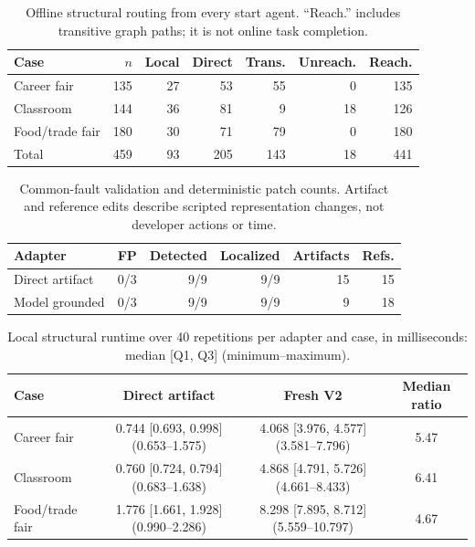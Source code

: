 \begin{table}[!htbp]
  \caption{Offline structural routing from every start agent. ``Reach.''
  includes transitive graph paths; it is not online task completion.}
  \label{tab:rq1-routing}
  \centering
  \begin{tabular}{@{}lrrrrrr@{}}
    \toprule
    Case & $n$ & Local & Direct & Trans. & Unreach. & Reach. \\
    \midrule
    Career fair & 135 & 27 & 53 & 55 & 0 & 135 \\
    Classroom & 144 & 36 & 81 & 9 & 18 & 126 \\
    Food/trade fair & 180 & 30 & 71 & 79 & 0 & 180 \\
    \midrule
    Total & 459 & 93 & 205 & 143 & 18 & 441 \\
    \bottomrule
  \end{tabular}
\end{table}

\begin{table}[!htbp]
  \caption{Common-fault validation and deterministic patch counts. Artifact
  and reference edits describe scripted representation changes, not developer
  actions or time.}
  \label{tab:rq2-faults}
  \centering
  \begin{tabular}{@{}lrrrrr@{}}
    \toprule
    Adapter & FP & Detected & Localized & Artifacts & Refs. \\
    \midrule
    Direct artifact & 0/3 & 9/9 & 9/9 & 15 & 15 \\
    Model grounded & 0/3 & 9/9 & 9/9 & 9 & 18 \\
    \bottomrule
  \end{tabular}
\end{table}

\begin{table}[!htbp]
  \caption{Local structural runtime over 40 repetitions per adapter and case,
  in milliseconds: median [Q1, Q3] (minimum--maximum).}
  \label{tab:rq2-runtime}
  \centering
  \begin{tabular}{@{}lccc@{}}
    \toprule
    Case & Direct artifact & Fresh V2 & Median ratio \\
    \midrule
    Career fair
      & 0.744 [0.693, 0.998] (0.653--1.575)
      & 4.068 [3.976, 4.577] (3.581--7.796)
      & 5.47 \\
    Classroom
      & 0.760 [0.724, 0.794] (0.683--1.638)
      & 4.868 [4.791, 5.726] (4.661--8.433)
      & 6.41 \\
    Food/trade fair
      & 1.776 [1.661, 1.928] (0.990--2.286)
      & 8.298 [7.895, 8.712] (5.559--10.797)
      & 4.67 \\
    \bottomrule
  \end{tabular}
\end{table}

